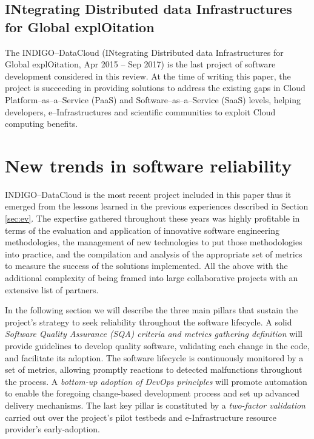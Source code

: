 \documentclass[journal]{IEEEtran}
\begin{document}
\subsection{INtegrating Distributed data Infrastructures for Global
explOitation}

The INDIGO--DataCloud (INtegrating Distributed data Infrastructures for Global
explOitation, Apr 2015 -- Sep 2017) \cite{cordis:indigo} is the last
project of software development considered in this review. At the time of writing
this paper, the project is succeeding in providing solutions to address the existing gaps in
Cloud Platform--as--a--Service (PaaS) and Software--as--a--Service (SaaS) levels,
helping developers, e--Infrastructures and scientific communities to exploit
Cloud computing benefits.

\section{New trends in software reliability}
\label{sec:ntsr}

INDIGO--DataCloud is the most recent project included in this paper thus it
emerged from the lessons learned in the previous experiences described in
Section \ref{sec:ev}. The expertise gathered throughout these years was highly
profitable in terms of the evaluation and application of innovative software engineering
methodologies, the management of new technologies to put those methodologies
into practice, and the compilation and analysis of the appropriate set of metrics to measure the
success of the solutions implemented. All the above with the additional complexity of
being framed into large collaborative projects with an extensive list of partners.

In the following section we will describe the three main pillars that sustain the project's strategy to seek reliability throughout the 
software lifecycle. A solid \textit{Software Quality Assurance (SQA) criteria
and metrics gathering definition} will provide guidelines to develop quality 
software, validating each change in the code, and facilitate its adoption. The software lifecycle is continuously monitored
by a set of metrics, allowing promptly reactions to detected malfunctions throughout the
process. A \textit{bottom-up adoption of DevOps principles} will promote automation to enable
the foregoing change-based development process and set up advanced delivery mechanisms.
The last key pillar is constituted by a \textit{two-factor validation} carried out over the project's pilot testbeds and
e-Infrastructure resource provider's early-adoption.
\end{document}
